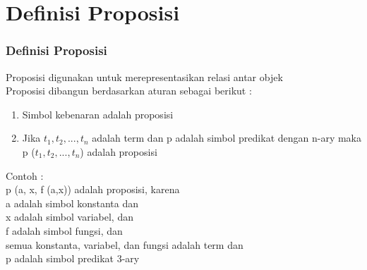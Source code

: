 \documentclass[handout]{beamer}
\theoremstyle{definition}
\theoremstyle{example}
\begin{document}
\section{Definisi Proposisi}
\begin{frame}
	\frametitle{Definisi Proposisi}
   Proposisi digunakan untuk merepresentasikan relasi antar objek\\
   Proposisi dibangun berdasarkan aturan sebagai berikut :\\
   \begin{enumerate} 
   	\item  Simbol kebenaran adalah proposisi
    \item  Jika $t_1, t_2, ..., t_n$ adalah term dan p adalah simbol predikat dengan n-ary maka p ($t_1,t_2, ..., t_n$) adalah proposisi
   \end{enumerate}
   Contoh :\\
   p (a, x, f (a,x)) adalah proposisi, karena\\
   a adalah simbol konstanta dan\\
   x adalah simbol variabel, dan\\
   f adalah simbol fungsi, dan\\   
   semua konstanta, variabel, dan fungsi adalah term dan\\
   p adalah simbol predikat 3-ary
\end{frame}		
\end{document}
